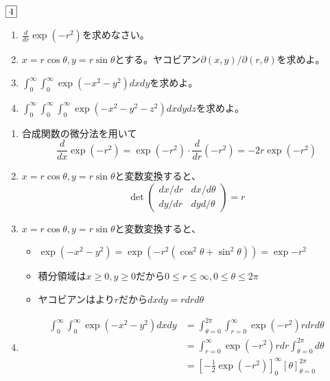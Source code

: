 \begin{tcolorbox} %
	$\fbox{4}$
\begin{enumerate}
	\item $\frac{d}{dr}\exp{(-r^2)}$を求めなさい。
	\item $x= r\cos{\theta}, y= r\sin{\theta}$とする。ヤコビアン${\partial(x, y)}/{\partial(r, \theta)}$を求めよ。
	\item $\int_0^\infty \int_0^\infty \exp{(-x^2- y^2)}dxdy$を求めよ。
	\item $\int_0^\infty \int_0^\infty\int_0^\infty \exp{(-x^2- y^2- z^2)}dxdydz$を求めよ。
\end{enumerate}
\end{tcolorbox}

\begin{souanswer} %
\begin{enumerate}
	\item 合成関数の微分法を用いて
\begin{equation*}
	\frac{d}{dx}\exp(-r^2)= \exp(-r^2)\cdot \frac{d}{dr}(-r^2)= -2r\exp{(-r^2)}
\end{equation*}
	\item\label{R8_3rd_4(2)} $x= r\cos{\theta}, y= r\sin{\theta}$と変数変換すると、
\begin{equation*}
	\det{\begin{pmatrix}dx/dr& dx/d\theta\\ dy/dr& dyd/\theta\end{pmatrix}}= r
\end{equation*}	
	\item $x= r\cos{\theta}, y= r\sin{\theta}$と変数変換すると、
\begin{itemize}
	\item $\exp{(-x^2- y^2)}= \exp{(-r^2(\cos^2\theta+ \sin^2\theta))}= \exp{-r^2}$
	\item 積分領域は$x\ge 0, y\ge 0$だから$0\le r\le \infty, 0\le \theta\le 2\pi$
	\item ヤコビアンはより$r$だから$dxdy= rdrd\theta$
\end{itemize}
	\item \label{R8_3rd_4(4)}
\begin{align*}
	\int_0^\infty \int_0^\infty \exp{(-x^2- y^2)}dxdy
	&= \int_{\theta= 0}^{2\pi}\int_{r= 0}^\infty \exp{(-r^2)}rdrd\theta\\
	&= \int_{r= 0}^\infty \exp{(-r^2)}rdr \int_{\theta= 0}^{2\pi}d\theta\\
	&= \left[-\frac{1}{2}\exp{(-r^2)}\right]_0^\infty \left[\theta\right]_{\theta= 0}^{2\pi}\\

\end{align*}
\end{enumerate}
\end{souanswer}
